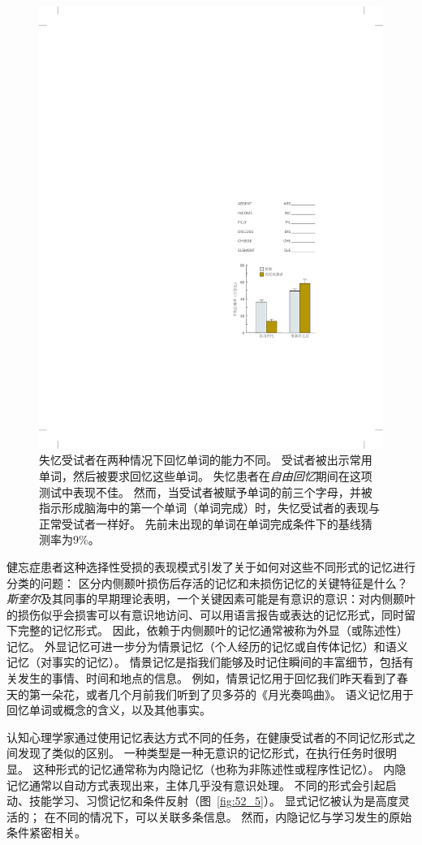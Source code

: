 \begin{figure}[htbp]
	\centering
	\includegraphics[width=0.47\linewidth]{chap52/fig_52_4}
	\caption{失忆受试者在两种情况下回忆单词的能力不同。
		受试者被出示常用单词，然后被要求回忆这些单词。
		失忆患者在\textit{自由回忆}期间在这项测试中表现不佳。
		然而，当受试者被赋予单词的前三个字母，并被指示形成脑海中的第一个单词（单词完成）时，失忆受试者的表现与正常受试者一样好。
		先前未出现的单词在单词完成条件下的基线猜测率为9\%\cite{squire1987memory}。}
	\label{fig:52_4}
\end{figure}


健忘症患者这种选择性受损的表现模式引发了关于如何对这些不同形式的记忆进行分类的问题：
区分内侧颞叶损伤后存活的记忆和未损伤记忆的关键特征是什么？
\textit{斯奎尔}及其同事的早期理论表明，一个关键因素可能是有意识的意识：对内侧颞叶的损伤似乎会损害可以有意识地访问、可以用语言报告或表达的记忆形式，同时留下完整的记忆形式。
因此，依赖于内侧颞叶的记忆通常被称为外显（或陈述性）记忆。
外显记忆可进一步分为情景记忆（个人经历的记忆或自传体记忆）和语义记忆（对事实的记忆）。
情景记忆是指我们能够及时记住瞬间的丰富细节，包括有关发生的事情、时间和地点的信息。
例如，情景记忆用于回忆我们昨天看到了春天的第一朵花，或者几个月前我们听到了贝多芬的《月光奏鸣曲》。
语义记忆用于回忆单词或概念的含义，以及其他事实。


认知心理学家通过使用记忆表达方式不同的任务，在健康受试者的不同记忆形式之间发现了类似的区别。
一种类型是一种无意识的记忆形式，在执行任务时很明显。
这种形式的记忆通常称为内隐记忆（也称为非陈述性或程序性记忆）。
内隐记忆通常以自动方式表现出来，主体几乎没有意识处理。
不同的形式会引起启动、技能学习、习惯记忆和条件反射（图~\ref{fig:52_5}）。
显式记忆被认为是高度灵活的；
在不同的情况下，可以关联多条信息。
然而，内隐记忆与学习发生的原始条件紧密相关。


